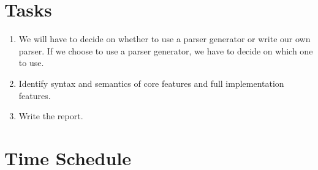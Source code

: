 \section{Tasks}
\label{sec:tasks}

\begin{enumerate}

  \item We will have to decide on whether to use a parser generator or write our own parser. If we choose to use a parser generator, we have to decide on which one to use.

  \item Identify syntax and semantics of core features and full implementation features.

  \item Write the report.

\end{enumerate}

\section{Time Schedule}
\label{sec:time_schedule}

